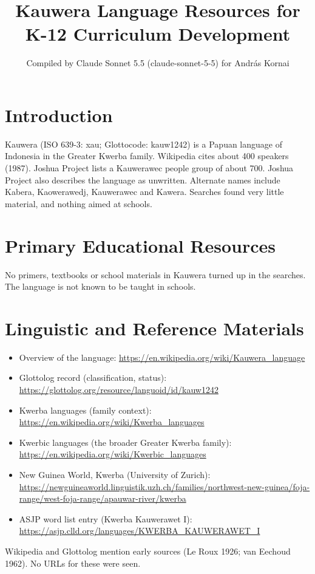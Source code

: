 \documentclass[12pt]{article}
\title{Kauwera Language Resources for K-12 Curriculum Development}
\author{Compiled by Claude Sonnet 5.5 (claude-sonnet-5-5) for Andr\'as Kornai}
\date{}
\begin{document}
\maketitle

\section{Introduction}
Kauwera (ISO 639-3: xau; Glottocode: kauw1242) is a Papuan language of Indonesia in the Greater Kwerba family. Wikipedia cites about 400 speakers (1987). Joshua Project lists a Kauwerawec people group of about 700. Joshua Project also describes the language as unwritten. Alternate names include Kabera, Kaowerawedj, Kauwerawec and Kawera. Searches found very little material, and nothing aimed at schools.

\section{Primary Educational Resources}
No primers, textbooks or school materials in Kauwera turned up in the searches. The language is not known to be taught in schools.

\section{Linguistic and Reference Materials}
\begin{itemize}
\item Overview of the language: \url{https://en.wikipedia.org/wiki/Kauwera_language}
\item Glottolog record (classification, status): \url{https://glottolog.org/resource/languoid/id/kauw1242}
\item Kwerba languages (family context): \url{https://en.wikipedia.org/wiki/Kwerba_languages}
\item Kwerbic languages (the broader Greater Kwerba family): \url{https://en.wikipedia.org/wiki/Kwerbic_languages}
\item New Guinea World, Kwerba (University of Zurich): \url{https://newguineaworld.linguistik.uzh.ch/families/northwest-new-guinea/foja-range/west-foja-range/apauwar-river/kwerba}
\item ASJP word list entry (Kwerba Kauwerawet I): \url{https://asjp.clld.org/languages/KWERBA_KAUWERAWET_I}
\end{itemize}
Wikipedia and Glottolog mention early sources (Le Roux 1926; van Eechoud 1962). No URLs for these were seen.
\end{document}
